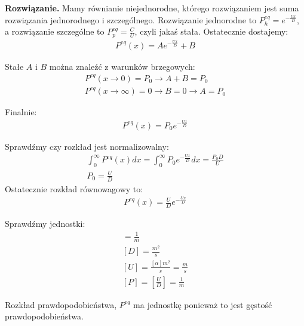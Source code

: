 \documentclass[11pt,a4paper]{article}
\newenvironment{solution}{\vspace{1cm} \par\textbf{Rozwiązanie.} \vspace{1cm}}{}
\begin{document}
\begin{solution}
Mamy równianie niejednorodne, którego rozwiązaniem jest suma rozwiązania jednorodnego i
szczególnego. Rozwiązanie jednorodne to $P^{eq}_{h} = e^{-\frac{Ux}{D}}$, 
a rozwiązanie szczególne to $P^{eq}_{p} = \frac{C}{U}$, czyli jakaś stała. 
Ostatecznie dostajemy:
\begin{align*}
    P^{eq}(x) = A e^{-\frac{Ux}{D}} + B
\end{align*}

Stałe $A$ i $B$ można znaleźć z warunków brzegowych:
\begin{align*}
    P^{eq}(x \to 0) = P_{0} \rightarrow A + B = P_{0} \\
    P^{eq}(x \to \infty) = 0 \rightarrow B = 0 \to A = P_{0}
\end{align*}

Finalnie:
\begin{align*}
    P^{eq}(x) = P_{0} e^{-\frac{Ux}{D}}
\end{align*}

Sprawdźmy czy rozkład jest normalizowalny:
\begin{align*}
    \int_{0}^{\infty} P^{eq}(x) dx = \int_{0}^{\infty} P_{0} e^{-\frac{Ux}{D}} dx = \frac{P_{0} D}{U} \\
    P_{0} = \frac{U}{D}
\end{align*}
Ostatecznie rozkład równowagowy to:
\begin{align*}
    P^{eq}(x) = \frac{U}{D} e^{-\frac{Ux}{D}}
\end{align*}

Sprawdźmy jednostki:
\begin{align*}
    [\alpha] = \frac{1}{m} \\
    [D] = \frac{m^{2}}{s} \\
    [U] = \frac{[\alpha] m^{2}}{s} = \frac{m}{s} \\
    [P] = [\frac{U}{D}] = \frac{1}{m}
\end{align*}

Rozkład prawdopodobieństwa, $P^{eq}$ ma jednostkę ponieważ to jest 
gęstość prawdopodobieństwa.


\end{solution}
\end{document}
